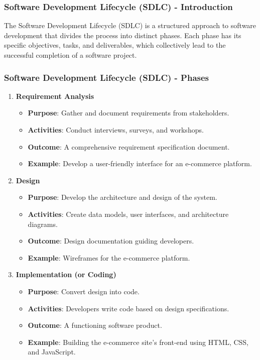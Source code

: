 \documentclass{beamer}
\begin{document}
\begin{frame}[fragile]
    \frametitle{Software Development Lifecycle (SDLC) - Introduction}
    The Software Development Lifecycle (SDLC) is a structured approach to software development that divides the process into distinct phases. Each phase has its specific objectives, tasks, and deliverables, which collectively lead to the successful completion of a software project.
\end{frame}

\begin{frame}[fragile]
    \frametitle{Software Development Lifecycle (SDLC) - Phases}
    \begin{enumerate}
        \item \textbf{Requirement Analysis}
            \begin{itemize}
                \item \textbf{Purpose}: Gather and document requirements from stakeholders.
                \item \textbf{Activities}: Conduct interviews, surveys, and workshops.
                \item \textbf{Outcome}: A comprehensive requirement specification document.
                \item \textbf{Example}: Develop a user-friendly interface for an e-commerce platform.
            \end{itemize}
        
        \item \textbf{Design}
            \begin{itemize}
                \item \textbf{Purpose}: Develop the architecture and design of the system.
                \item \textbf{Activities}: Create data models, user interfaces, and architecture diagrams.
                \item \textbf{Outcome}: Design documentation guiding developers.
                \item \textbf{Example}: Wireframes for the e-commerce platform.
            \end{itemize}
        
        \item \textbf{Implementation (or Coding)}
            \begin{itemize}
                \item \textbf{Purpose}: Convert design into code.
                \item \textbf{Activities}: Developers write code based on design specifications.
                \item \textbf{Outcome}: A functioning software product.
                \item \textbf{Example}: Building the e-commerce site’s front-end using HTML, CSS, and JavaScript.
            \end{itemize}
    \end{enumerate}
\end{frame}
\end{document}
